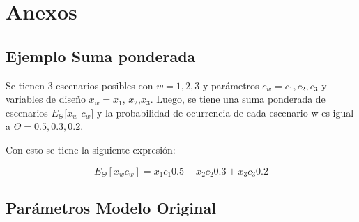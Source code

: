 
\chapter{Anexos}
\label{}



\section{Ejemplo Suma ponderada}\label{ej:sumapond}

Se tienen 3 escenarios posibles con $w = 1,2,3$ y parámetros $c_{w}= c_1,c_2,c_3$ y variables de diseño $x_{w}=x_{1}$, $x_{2}$,$x_{3}$. Luego, se tiene una suma ponderada de escenarios  $E_{\Theta}$[$x_{w}$ $c_{w}$] y la probabilidad de ocurrencia de cada escenario w es igual a $\Theta ={0.5 , 0.3 ,0.2 }$.
\vspace{2.5mm}

Con esto se tiene la siguiente expresión:

$$E_{\Theta} [ x_{w} c_{w}] = x_{1}c_{1}0.5 + x_{2}c_{2}0.3 + x_{3}c_{3}0.2 $$

\section{Parámetros Modelo Original}\label{anexo:parametros}


